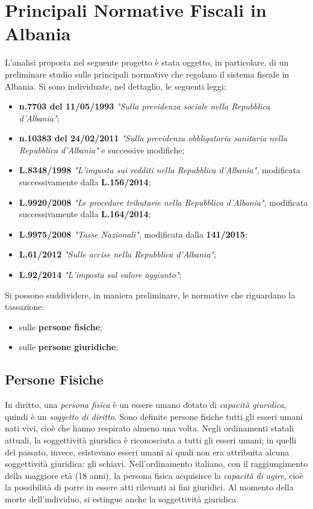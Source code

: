 \chapter[Principali Normative Fiscali in Albania]{Principali Normative Fiscali in Albania}
  \label{sec:normative_fiscali_albania}
L'analisi proposta nel seguente progetto è stata oggetto, in particolare, di un preliminare studio sulle principali normative che regolano  il sistema fiscale in Albania. Si sono individuate, nel dettaglio, le seguenti leggi\cite{studio_palmeri}\cite{deloitte_albania}\cite{assocamerestero_albania}\cite{infomercati_albania}: 
\begin{itemize}
\item \textbf{n.7703 del 11/05/1993} \textit{"Sulla previdenza sociale nella Repubblica d'Albania"};
\item \textbf{n.10383 del 24/02/2011} \textit{"Sulla previdenza obbligatoria sanitaria nella Repubblica d'Albania"} e successive modifiche;
\item \textbf{L.8348/1998} \textit{"L'imposta sui redditi nella Repubblica d'Albania"}, modificata successivamente dalla \textbf{L.156/2014};
\item \textbf{L.9920/2008} \textit{"Le procedure tributarie nella Repubblica d'Albania"}, modificata successivamente dalla \textbf{L.164/2014};
\item \textbf{L.9975/2008} \textit{"Tasse Nazionali"}, modificata dalla \textbf{141/2015};
\item \textbf{L.61/2012} \textit{"Sulle accise nella Repubblica d'Albania"};
\item \textbf{L.92/2014} \textit{"L'imposta sul valore aggiunto"}; 
\end{itemize}
Si possono suddividere, in maniera preliminare, le normative che riguardano la tassazione:
\begin{itemize}
\item sulle \textbf{persone fisiche};
\item sulle \textbf{persone giuridiche};
\end{itemize}
\clearpage
\section[Persone Fisiche]{Persone Fisiche}
In diritto, una \textit{persona fisica} è un essere umano dotato di \textit{capacità giuridica}, quindi è un \textit{soggetto di diritto}. Sono definite persone fisiche tutti gli esseri umani nati vivi, cioè che hanno respirato almeno una volta. Negli ordinamenti statali attuali, la soggettività giuridica è riconosciuta a tutti gli esseri umani; in quelli del passato, invece, esistevano esseri umani ai quali non era attribuita alcuna soggettività giuridica: gli schiavi.\newline
Nell'ordinamento italiano, con il raggiungimento della maggiore età (18 anni), la persona fisica acquisisce la \textit{capacità di agire}, cioè la possibilità di porre in essere atti rilevanti ai fini giuridici. Al momento della morte dell'individuo, si estingue anche la soggettività giuridica. 

